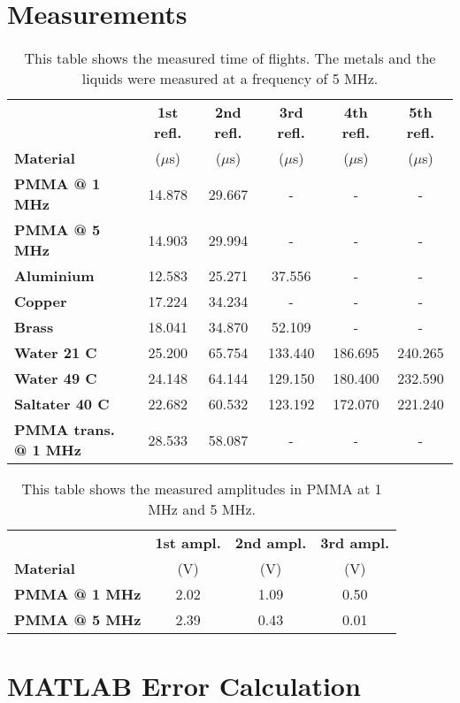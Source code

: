 \begin{appendix}
	\section{Measurements}
	\label{sec:Measurements}
	
	\begin{table}[H]
		\centering
		\begin{tabular}{l|c|c|c|c|c}
			& \textbf{1st refl.} & \textbf{2nd refl.} & \textbf{3rd refl.} & \textbf{4th refl.} & \textbf{5th refl.} \\
			\textbf{Material} & ($\mu$s) & ($\mu$s) & ($\mu$s) & ($\mu$s) & ($\mu$s) \\
			\hline\hline
			\textbf{PMMA @ 1 MHz} & 14.878 & 29.667 & - & - & - \\ \hline
			\textbf{PMMA @ 5 MHz} & 14.903 & 29.994 & - & - & - \\ \hline
			\textbf{Aluminium} & 12.583 & 25.271 & 37.556 & - & - \\ \hline
			\textbf{Copper} & 17.224 & 34.234 & - & - & - \\ \hline
			\textbf{Brass} & 18.041 & 34.870 & 52.109 & - & - \\ \hline
			\textbf{Water 21 \textdegree C} & 25.200 & 65.754 & 133.440 & 186.695 & 240.265 \\ \hline
			\textbf{Water 49 \textdegree C} & 24.148 & 64.144 & 129.150 & 180.400 & 232.590 \\ \hline
			\textbf{Saltater 40 \textdegree C} & 22.682 & 60.532 & 123.192 & 172.070 & 221.240 \\ \hline
			\textbf{PMMA trans. @ 1 MHz} & 28.533 & 58.087 & - & - & - \\ \hline
		\end{tabular}
		\caption{This table shows the measured time of flights. The metals and the liquids were measured at a frequency of 5 MHz.}
		\label{tab:Time_of_Flight_Measurements}
	\end{table}

	\begin{table}[H]
		\centering
		\begin{tabular}{l|c|c|c}
			& \textbf{1st ampl.} & \textbf{2nd ampl.} & \textbf{3rd ampl.} \\
			\textbf{Material} & (V) & (V) & (V) \\
			\hline\hline
			\textbf{PMMA @ 1 MHz} & 2.02 & 1.09 & 0.50 \\ \hline
			\textbf{PMMA @ 5 MHz} & 2.39 & 0.43 & 0.01 \\ \hline
		\end{tabular}
		\caption{This table shows the measured amplitudes in PMMA at 1 MHz and 5 MHz.}
		\label{tab:Amplitude_Measurements}
	\end{table}

	\newpage

	\section{MATLAB Error Calculation}
	\label{sec:MATLAB_Error_Calculation}
	
\end{appendix}
